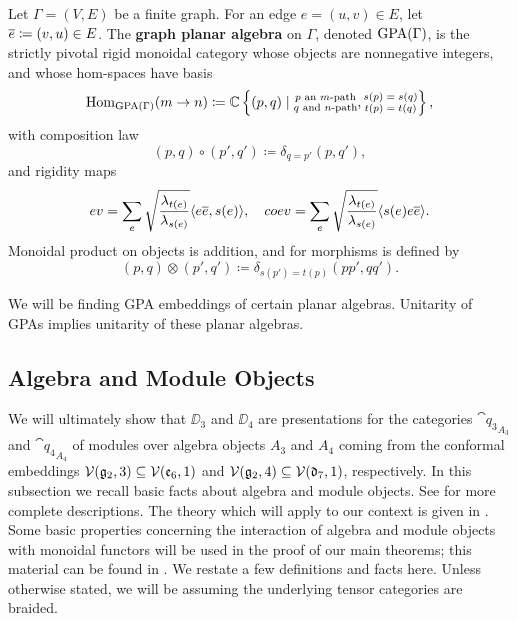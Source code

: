 \begin{definition}\label{def:GPA}
    Let $\Gamma=(V,E)$ be a finite graph. 
    For an edge $e=(u,v)\in E$, let $\overline{e} \coloneq (v,u)\in E$. 
    The {\bf graph planar algebra} on $\Gamma$, denoted $\operatorname{GPA}(\Gamma)$, is the strictly pivotal rigid monoidal category 
    whose objects are nonnegative integers, and whose hom-spaces have basis
    \[
        \operatorname{Hom}_{\operatorname{GPA}(\Gamma)}(m\to n) \coloneqq \mathbb{C}\left\{ (p,q) \mid \substack{\text{$p$ an $m$-path} \\ \text{$q$ and $n$-path}}, \substack{\text{$s(p)=s(q)$}\\ \text{$t(p)=t(q)$}} \right\},
    \]
    with composition law
    \[
        (p,q)\circ(p',q')\coloneqq \delta_{q=p'} (p,q'),
    \]
    and rigidity maps
    \[
        ev = \sum_e \sqrt{ \frac{\lambda_{t(e)}}{\lambda_{s(e)}} } \langle e\overline{e},s(e) \rangle, \quad coev = \sum_e \sqrt{ \frac{\lambda_{t(e)}}{\lambda_{s(e)}} } \langle s(e) e\overline{e} \rangle. 
    \]
    Monoidal product on objects is addition, and for morphisms is defined by 
    \[
        (p,q)\otimes(p',q')\coloneqq \delta_{s(p')=t(p)} (pp',qq').
    \]
\end{definition}


We will be finding GPA embeddings of certain planar algebras. 
Unitarity of GPAs implies unitarity of these planar algebras.






\subsection{Algebra and Module Objects}
We will ultimately show that $\DD_3$ and $\DD_4$ are presentations for the categories
$\cat{q_3}_{A_3}$ and $\cat{q_4}_{A_4}$ of modules over algebra objects $A_3$ and $A_4$ coming from the conformal embeddings 
$\mathcal{V}(\mathfrak{g}_2,3) \subseteq \mathcal{V}(\mathfrak{e}_6,1)$ and $\mathcal{V}(\mathfrak{g}_2,4) \subseteq \mathcal{V}(\mathfrak{d}_7,1)$, respectively. 
In this subsection we recall basic facts about algebra and module objects. 
See \cite{EGNO, ostrik2001modulecategoriesweakhopf} for more complete descriptions. 
The theory which will apply to our context is given in \cite{cain_noah}.
Some basic properties concerning the interaction of algebra and module objects with
monoidal functors will be used in the proof of our main theorems;
this material can be found in \cite{monoidalFunctorsAndAlgebras}.
We restate a few definitions and facts here.
Unless otherwise stated, we will be assuming the underlying tensor categories are braided.


